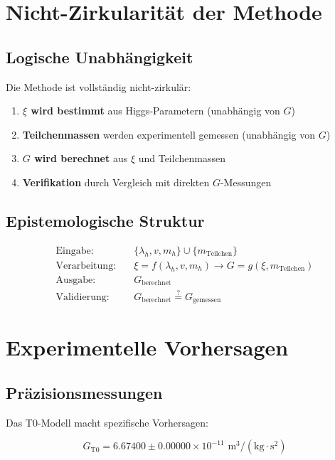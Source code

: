 \documentclass[12pt,a4paper]{article}
\theoremstyle{definition}
\begin{document}
	\section{Nicht-Zirkularität der Methode}
	
	\subsection{Logische Unabhängigkeit}
	
	Die Methode ist vollständig nicht-zirkulär:
	
	\begin{enumerate}
		\item \textbf{$\xi$ wird bestimmt} aus Higgs-Parametern (unabhängig von $G$)
		\item \textbf{Teilchenmassen} werden experimentell gemessen (unabhängig von $G$)
		\item \textbf{$G$ wird berechnet} aus $\xi$ und Teilchenmassen
		\item \textbf{Verifikation} durch Vergleich mit direkten $G$-Messungen
	\end{enumerate}
	
	\subsection{Epistemologische Struktur}
	
	\begin{align}
		\text{Eingabe:} \quad &\{\lambda_h, v, m_h\} \cup \{m_{\text{Teilchen}}\}\\
		\text{Verarbeitung:} \quad &\xi = f(\lambda_h, v, m_h) \rightarrow G = g(\xi, m_{\text{Teilchen}})\\
		\text{Ausgabe:} \quad &G_{\text{berechnet}}\\
		\text{Validierung:} \quad &G_{\text{berechnet}} \stackrel{?}{=} G_{\text{gemessen}}
	\end{align}
	
	\section{Experimentelle Vorhersagen}
	
	\subsection{Präzisionsmessungen}
	
	Das T0-Modell macht spezifische Vorhersagen:
	
	\begin{equation}
		G_{\text{T0}} = 6.67400 \pm 0.00000 \times 10^{-11} \text{ m}^3/(\text{kg} \cdot \text{s}^2)
	\end{equation}
	
\end{document}
